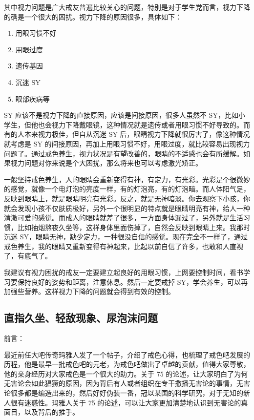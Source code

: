 \documentclass[fontset=founder]{ctexart}
\begin{document}
其中视力问题是广大戒友普遍比较关心的问题，特别是对于学生党而言，视力下降的确是一个很大的困扰。视力下降的原因很多，具体如下：

\begin{enumerate}
    \item 用眼习惯不好
    \item 用眼过度
    \item 遗传基因
    \item 沉迷 SY
    \item 眼部疾病等
\end{enumerate}

SY 应该不是视力下降的直接原因，应该是间接原因，很多人虽然不 SY，比如小学生，但他也会视力下降戴眼镜，这种情况就是遗传或者用眼习惯不好导致的。而有的人本来视力极佳，但自从沉迷 SY 后，眼睛视力下降就很厉害了，像这种情况就考虑是 SY 的间接原因，再加上用眼习惯不好，用眼过度，就比较容易出现视力问题了。通过戒色养生，视力状况是有望改善的，眼睛的不适感也会有所缓解。如果视力问题对你来说是个大困扰，那么将来也可以考虑激光矫正。

一般坚持戒色养生，人的眼睛会重新变得有神，有定力，有光彩。光彩是个很微妙的感觉，就像一个电灯泡的亮度一样，有的灯泡亮，有的灯泡暗。而人体阳气足，反映到眼睛上，就是眼睛明亮有光彩。反之，就是无神暗淡。你去观察下小孩，你就会发现小孩不仅肤质极好，另外一个很明显的特点就是眼睛明亮有神，给人一种清澈可爱的感觉。而成人的眼睛就差了很多，一方面身体漏过了，另外就是生活习惯，比如抽烟熬夜久坐等，这样身体里面伤掉了，自然会反映到眼睛上来。我那时沉迷 SY，眼睛无神，缺少定力，一种很没自信的感觉。现在完全不一样了，通过戒色养生，我的眼睛又重新变得有神起来，比起以前自信了许多，也敢和人直视了，有底气了。

我建议有视力困扰的戒友一定要建立起良好的用眼习惯，上网要控制时间，看书学习要保持良好的姿势和距离，注意休息。然后一定要戒掉 SY，学会养生，可以再加强些营养。这样视力下降的问题就会得到有效的控制。

\subsection{直指久坐、轻敌现象、尿泡沫问题}

前言：

最近前任大吧传奇玛雅人发了一个帖子，介绍了戒色心得，也梳理了戒色吧发展的历程，他是最早一批戒色吧的元老，为戒色吧做出了卓越的贡献，值得大家尊敬，他的亲身经历对大家戒色是一个很大的助力。关于 75 的论述，让大家明白了为何无害论会如此猖獗的原因，因为背后有人或者组织在专干撒播无害论的事情，无害论很多都是编造出来的，然后好好伪装一番，冠以某国的科学研究，对于无知的新人很有迷惑性。玛雅人关于 75 的论述，可以让大家更加清楚地认识到无害论的真面目，以及背后的推手。
\end{document}
